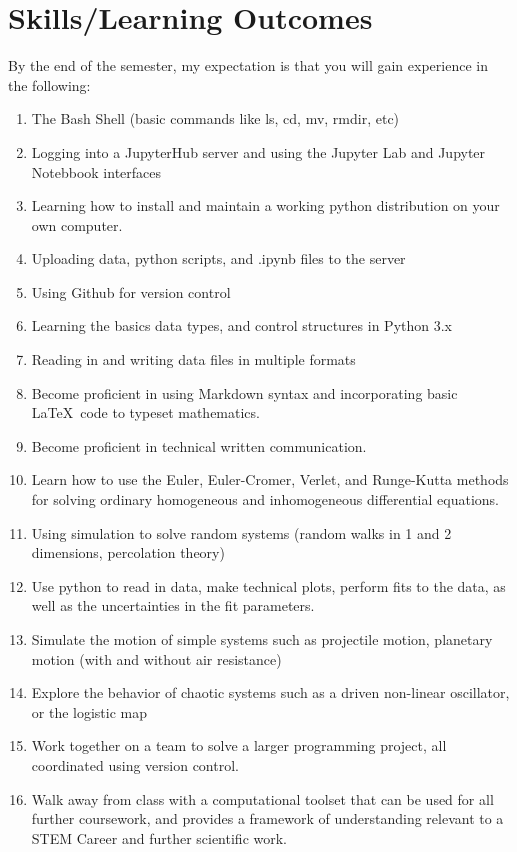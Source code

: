 \documentclass[justified]{tufte-handout}
\begin{document}
\section*{Skills/Learning Outcomes}
By the end of the semester, my expectation is that you will gain experience in the following:
\begin{enumerate}
\item The Bash Shell (basic commands like ls, cd, mv, rmdir, etc)
\item Logging into a JupyterHub server and using the Jupyter Lab and Jupyter Notebbook interfaces
\item Learning how to install and maintain a working python distribution on your own computer.
\item Uploading data, python scripts, and .ipynb files to the server
\item Using Github for version control 
\item Learning the basics data types, and control structures in Python 3.x
\item Reading in and writing data files in multiple formats
\item Become proficient in using Markdown syntax and incorporating basic \LaTeX\ code to typeset mathematics.
\item Become proficient in technical written communication.
\item Learn how to use the Euler, Euler-Cromer, Verlet, and Runge-Kutta methods for solving ordinary homogeneous and inhomogeneous differential equations.
\item Using simulation to solve random systems (random walks in 1 and 2 dimensions, percolation theory) 
\item Use python to read in data, make technical plots, perform fits to the data, as well as the uncertainties in the fit parameters.
\item Simulate the motion of simple systems such as projectile motion, planetary motion (with and without air resistance)
\item Explore the behavior of chaotic systems such as a driven non-linear oscillator, or the logistic map
\item Work together on a team to solve a larger programming project, all coordinated using version control.
\item Walk away from class with a computational toolset that can be used for all further coursework, and provides a framework of understanding relevant to a STEM Career and further scientific work. 
\end{enumerate}
\end{document}
